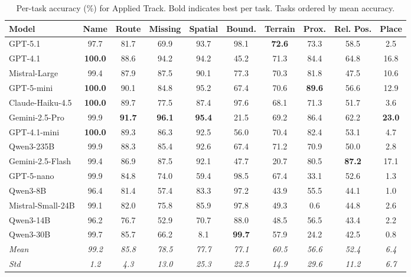 \begin{table}[htbp]
\centering
\caption{Per-task accuracy (\%) for Applied Track. Bold indicates best per task. Tasks ordered by mean accuracy.}
\label{tab:per_task_applied}
\small
\begin{tabular}{lccccccccc}
\toprule
\textbf{Model} & \textbf{Name} & \textbf{Route} & \textbf{Missing} & \textbf{Spatial} & \textbf{Bound.} & \textbf{Terrain} & \textbf{Prox.} & \textbf{Rel. Pos.} & \textbf{Place} \\
\midrule
GPT-5.1 & 97.7 & 81.7 & 69.9 & 93.7 & 98.1 & \textbf{72.6} & 73.3 & 58.5 & 2.5 \\
GPT-4.1 & \textbf{100.0} & 88.6 & 94.2 & 94.2 & 45.2 & 71.3 & 84.4 & 64.8 & 16.8 \\
Mistral-Large & 99.4 & 87.9 & 87.5 & 90.1 & 77.3 & 70.3 & 81.8 & 47.5 & 10.6 \\
GPT-5-mini & \textbf{100.0} & 90.1 & 84.8 & 95.2 & 67.4 & 70.6 & \textbf{89.6} & 56.6 & 12.9 \\
Claude-Haiku-4.5 & \textbf{100.0} & 89.7 & 77.5 & 87.4 & 97.6 & 68.1 & 71.3 & 51.7 & 3.6 \\
Gemini-2.5-Pro & 99.9 & \textbf{91.7} & \textbf{96.1} & \textbf{95.4} & 21.5 & 69.2 & 86.4 & 62.2 & \textbf{23.0} \\
GPT-4.1-mini & \textbf{100.0} & 89.3 & 86.3 & 92.5 & 56.0 & 70.4 & 82.4 & 53.1 & 4.7 \\
Qwen3-235B & 99.9 & 88.3 & 85.4 & 92.6 & 67.4 & 71.2 & 70.9 & 50.0 & 2.8 \\
Gemini-2.5-Flash & 99.4 & 86.9 & 87.5 & 92.1 & 47.7 & 20.7 & 80.5 & \textbf{87.2} & 17.1 \\
GPT-5-nano & 99.9 & 84.8 & 74.0 & 59.4 & 98.5 & 67.4 & 33.1 & 52.6 & 1.3 \\
Qwen3-8B & 96.4 & 81.4 & 57.4 & 83.3 & 97.2 & 43.9 & 55.5 & 44.1 & 1.0 \\
Mistral-Small-24B & 99.1 & 82.0 & 75.8 & 85.9 & 97.8 & 49.3 & 0.6 & 44.8 & 2.6 \\
Qwen3-14B & 96.2 & 76.7 & 52.9 & 70.7 & 88.0 & 48.5 & 56.5 & 43.4 & 2.2 \\
Qwen3-30B & 99.7 & 85.7 & 66.2 & 8.1 & \textbf{99.7} & 57.9 & 24.2 & 42.5 & 0.8 \\
\midrule
\textit{Mean} & \textit{99.2} & \textit{85.8} & \textit{78.5} & \textit{77.7} & \textit{77.1} & \textit{60.5} & \textit{56.6} & \textit{52.4} & \textit{6.4} \\
\textit{Std} & \textit{1.2} & \textit{4.3} & \textit{13.0} & \textit{25.3} & \textit{22.5} & \textit{14.9} & \textit{29.6} & \textit{11.2} & \textit{6.7} \\
\bottomrule
\end{tabular}
\end{table}

